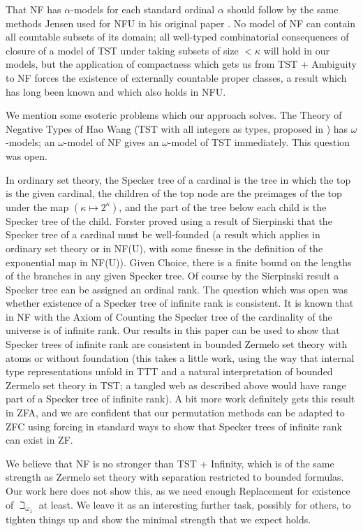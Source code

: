 \documentclass[112pt]{article}
\begin{document}
That NF has $\alpha$-models for each standard ordinal $\alpha$ should follow by the same methods Jensen used for NFU in his original paper \cite{nfu}.   No model of NF can contain all countable subsets of its domain;  all well-typed combinatorial consequences
of closure of a model of TST under taking subsets of size $<\kappa$ will hold in our models, but the application of compactness which gets us from TST + Ambiguity to NF forces the existence of externally countable proper classes, a result which has long been known and which also holds in NFU.

We mention some esoteric problems which our approach solves.  The Theory of Negative Types of Hao Wang (TST with all integers as types, proposed in \cite{tnt})  has $\omega$-models;  an $\omega$-model of NF gives an $\omega$-model of TST immediately.  This question was open.

In ordinary set theory, the Specker tree of a cardinal is the tree in which the top is the given cardinal, the children of the top node  are the preimages of the top under the map $(\kappa \mapsto 2^{\kappa})$, and the part of the tree
below each child is the Specker tree of the child.  Forster proved using a result of Sierpinski that the Specker tree of a cardinal must be well-founded (a result which applies in ordinary set theory or in NF(U), with some finesse in the definition of the exponential map in NF(U)).  Given Choice, there is a finite bound on the lengths of the branches in any given Specker tree.  Of course by the Sierpinski result a Specker tree can be assigned an ordinal rank.  The question which was open
was whether existence of a Specker tree of infinite rank is consistent.  It is known that in NF with the Axiom of Counting the Specker tree of the cardinality of the universe is of infinite rank.  Our results in this paper can be used to show that Specker trees of infinite rank are consistent in bounded Zermelo set theory with atoms or without foundation (this takes a little work, using the way that internal type representations unfold in TTT and a natural interpretation of bounded Zermelo set theory in TST;  a tangled web as described above would have range part of a Specker tree of infinite rank).  A bit more work definitely gets this result in ZFA, and we are confident that our permutation methods can be adapted to ZFC using forcing in standard ways to show that Specker trees of infinite rank can exist in ZF.

We believe that NF is no stronger than TST + Infinity, which is of the same strength as Zermelo set theory with separation restricted to bounded formulas.  Our work here does not show this, as we need enough Replacement for
existence of $\beth_{\omega_1}$ at least.  We leave it as an interesting further task, possibly for others, to tighten things up and show the minimal strength that we expect holds.
\end{document}
